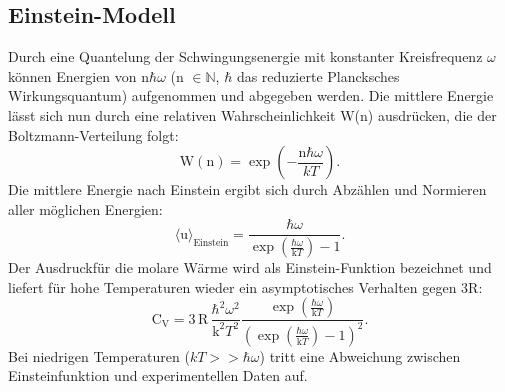\subsection{Einstein-Modell}
\label{sec:Einstein-Modell}
Durch eine Quantelung der Schwingungsenergie mit konstanter Kreisfrequenz $\omega$
können Energien von n$\hbar\omega$ (n $\in \mathds{N}$, $\hbar$ das reduzierte Plancksches Wirkungsquantum) aufgenommen und abgegeben werden.
Die mittlere Energie lässt sich nun durch eine relativen Wahrscheinlichkeit W(n)
ausdrücken, die der Boltzmann-Verteilung folgt:
\begin{equation}
  \text{W}(\text{n}) = \exp{\left(-\frac{\text{n}\hbar\omega}{kT}\right)}.
\end{equation}
Die mittlere Energie nach Einstein ergibt sich durch Abzählen und Normieren aller möglichen Energien:
\begin{equation}
  \langle \text{u} \rangle_\text{Einstein} = \frac{\hbar\omega}{\exp{\left(\frac{\hbar\omega}{\text{k}T}\right)}-1}.
\end{equation}
Der Ausdruckfür die molare Wärme wird als Einstein-Funktion bezeichnet
und liefert für hohe Temperaturen wieder ein asymptotisches Verhalten gegen 3R:
\begin{equation}
  \text{C}_\text{V} = 3\,\text{R}\,\frac{\hbar^2\omega^2}{\text{k}^2T^2}\frac{\exp{\left(\frac{\hbar\omega}{\text{k}T}\right)}}{(\exp{\left(\frac{\hbar\omega}{\text{k}T}\right)}-1)^2}.
\end{equation}
Bei niedrigen Temperaturen ($kT >> \hbar\omega$) tritt eine Abweichung zwischen Einsteinfunktion und experimentellen Daten auf.

